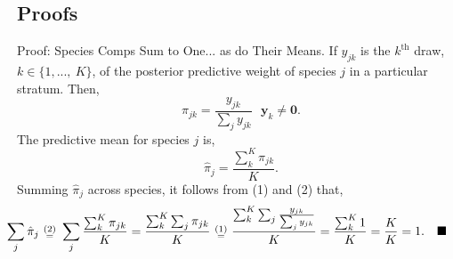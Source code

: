 \documentclass[ xcolor = pdftex, dvipsnames, table ]{beamer}
\begin{document}
%
%

%
\subsection{Proofs}
\begin{frame}{Proof: Species Comps Sum to One... as do Their Means.}
%
If $y_{jk}$ is the $k^{\text{th}}$ draw, $k\in\{1,...,~K\}$, of the posterior predictive weight of species $j$ in a particular stratum. Then,
%
\begin{equation}
\pi_{jk} = \frac{y_{jk}}{\sum_j y_{jk}} ~~~ \bm{y}_{k}\neq \bm{0}.
\end{equation}
The predictive mean for species $j$ is,
\begin{equation}
        \hat\pi_{j} = \frac{\sum_k^K \pi_{jk}}{K}. 
\end{equation}
Summing $\hat\pi_{j}$ across species, it follows from (1) and (2) that,
\begin{equation*}
        \hspace*{-0.8cm}
        \sum_j \hat\pi_{j} ~\substack{(2)\\=}~ \sum_j\frac{\sum_k^K \pi_{jk}}{K} = \frac{\sum_k^K \sum_j \pi_{jk}}{K}~\substack{(1)\\=}~\frac{\sum_k^K \sum_j \frac{y_{jk}}{\sum_j y_{jk}}}{K} = \frac{\sum_k^K 1}{K} = \frac{K}{K}=1. ~~~\blacksquare
\end{equation*}
%
\end{frame}

%
%
\end{document}
